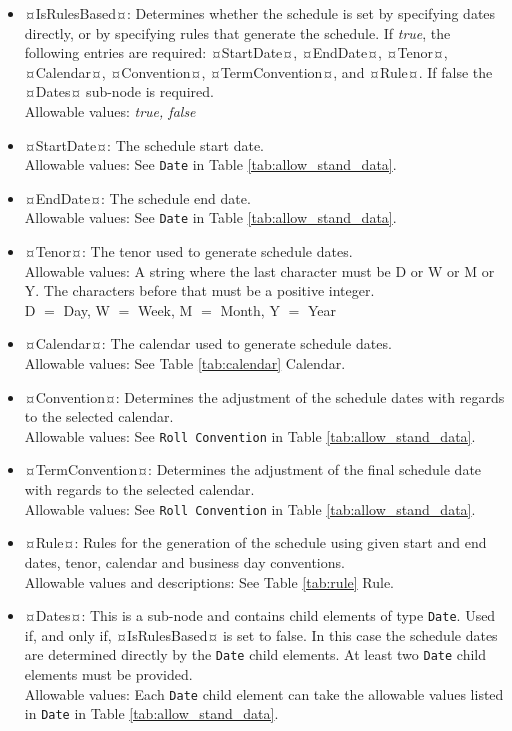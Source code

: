 \begin{itemize}
\item ¤IsRulesBased¤:  Determines whether the schedule is set by specifying dates directly, or by specifying rules that generate the schedule. If \emph{true}, the following entries are required: ¤StartDate¤, ¤EndDate¤, ¤Tenor¤, ¤Calendar¤,  ¤Convention¤, ¤TermConvention¤, and  ¤Rule¤.  If false the ¤Dates¤ sub-node is required. \\ Allowable values:  \emph{true, false}
\item ¤StartDate¤:  The schedule start date.  \\ Allowable values:  See \lstinline!Date! in Table \ref{tab:allow_stand_data}.
\item ¤EndDate¤: The schedule end date.  \\ Allowable values:  See \lstinline!Date! in Table \ref{tab:allow_stand_data}.
\item ¤Tenor¤: The tenor used to generate schedule dates. \\Allowable values: A string where the last character must be D or W or M or Y.  The characters before that must be a positive integer. \\D $=$ Day, W $=$ Week, M $=$ Month, Y $=$ Year
\item ¤Calendar¤: The calendar used to generate schedule dates. \\Allowable values: See Table \ref{tab:calendar} Calendar.




\item ¤Convention¤: Determines the adjustment of the schedule dates with regards to the selected calendar. \\Allowable values: See \lstinline!Roll Convention! in Table \ref{tab:allow_stand_data}.
\item ¤TermConvention¤: Determines the adjustment of the final schedule date with regards to the selected calendar. \\Allowable values: See \lstinline!Roll Convention! in Table \ref{tab:allow_stand_data}.
\item ¤Rule¤: Rules for the generation of the schedule using given start and end dates, tenor, calendar and business day conventions. \\Allowable values and descriptions: See Table \ref{tab:rule} Rule.
\item ¤Dates¤: This is a sub-node and contains child elements of type \lstinline!Date!. Used if, and only if, ¤IsRulesBased¤ is set to false. In this case the schedule dates are determined directly by the \lstinline!Date! child elements.  At least two \lstinline!Date! child elements must be provided.     \\Allowable values:  Each \lstinline!Date!  child element can take the allowable values listed in \lstinline!Date! in Table \ref{tab:allow_stand_data}.
\end{itemize}




